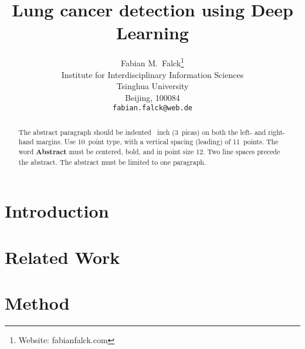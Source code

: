 \documentclass{article}
\title{Lung cancer detection using Deep Learning}
\author{
  Fabian M.~Falck\thanks{Website: fabianfalck.com} \\
  Institute for Interdisciplinary Information Sciences\\
  Tsinghua University\\
  Beijing, 100084 \\
  \texttt{fabian.falck@web.de} \\
}
\begin{document}

\maketitle

\begin{abstract}
  The abstract paragraph should be indented ~inch
  (3~picas) on both the left- and right-hand margins. Use 10~point
  type, with a vertical spacing (leading) of 11~points.  The word
  \textbf{Abstract} must be centered, bold, and in point size 12. Two
  line spaces precede the abstract. The abstract must be limited to
  one paragraph.
\end{abstract}

\section{Introduction}

\section{Related Work}

\section{Method}

\citep{massey}









\end{document}
